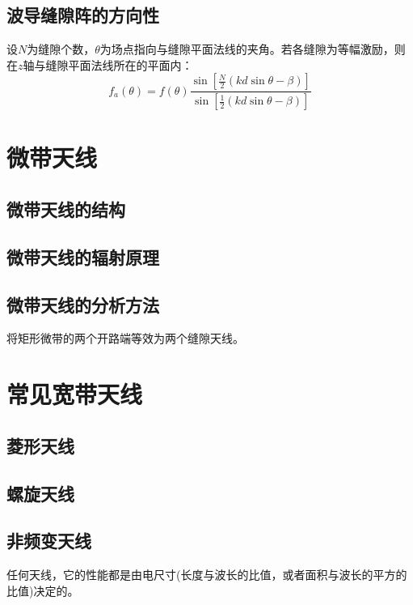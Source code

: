     \subsection{波导缝隙阵的方向性}
    设$N$为缝隙个数，$\theta$为场点指向与缝隙平面法线的夹角。若各缝隙为等幅激励，则在$z$轴与缝隙平面法线所在的平面内：
    \begin{equation}
        f_a(\theta)=f(\theta)\frac{\sin\left[\frac{N}{2}(kd\sin\theta-\beta)\right]}{\sin\left[\frac{1}{2}(kd\sin\theta-\beta)\right]}
    \end{equation}



\section{微带天线}

    \subsection{微带天线的结构}

    \subsection{微带天线的辐射原理}

    \subsection{微带天线的分析方法}
    将矩形微带的两个开路端等效为两个缝隙天线。


\section{常见宽带天线}

    \subsection{菱形天线}    
    
    \subsection{螺旋天线}
        
    \subsection{非频变天线}
    任何天线，它的性能都是由电尺寸(长度与波长的比值，或者面积与波长的平方的比值)决定的。

